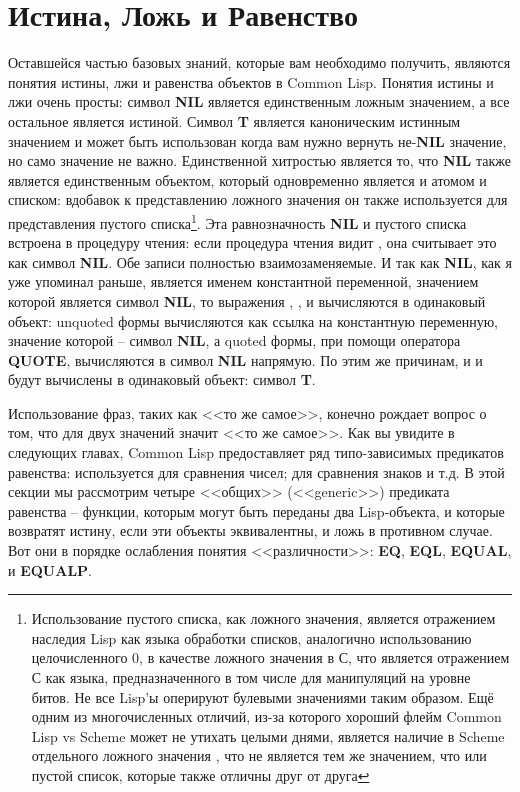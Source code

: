 \section{Истина, Ложь и Равенство}

Оставшейся частью базовых знаний, которые вам необходимо получить, являются понятия
истины, лжи и равенства объектов в Common Lisp. Понятия истины и лжи очень просты: символ
\textbf{NIL} является единственным ложным значением, а все остальное является
истиной. Символ \textbf{T} является каноническим истинным значением и может быть
использован когда вам нужно вернуть не-\textbf{NIL} значение, но само значение не
важно. Единственной хитростью является то, что \textbf{NIL} также является единственным
объектом, который одновременно является и атомом и списком: вдобавок к представлению
ложного значения он также используется для представления пустого
списка\footnote{Использование пустого списка, как ложного значения, является отражением
  наследия Lisp как языка обработки списков, аналогично использованию целочисленного 0, в
  качестве ложного значения в С, что является отражением С как языка, предназначенного в
  том числе для манипуляций на уровне битов. Не все Lisp'ы оперируют булевыми значениями
  таким образом. Ещё одним из многочисленных отличий, из-за которого хороший флейм Common
  Lisp vs Scheme может не утихать целыми днями, является наличие в Scheme отдельного
  ложного значения , что не является тем же значением, что  или пустой
  список, которые также отличны друг от друга}. Эта равнозначность \textbf{NIL} и пустого
списка встроена в процедуру чтения: если процедура чтения видит \code{()}, она считывает
это как символ \textbf{NIL}. Обе записи полностью взаимозаменяемые. И так как
\textbf{NIL}, как я уже упоминал раньше, является именем константной переменной, значением
которой является символ \textbf{NIL}, то выражения , \code{()},  и
 вычисляются в одинаковый объект: unquoted формы вычисляются как ссылка на
константную переменную, значение которой -- символ \textbf{NIL}, а quoted формы, при
помощи оператора \textbf{QUOTE}, вычисляются в символ \textbf{NIL} напрямую. По этим же
причинам, и  и  будут вычислены в одинаковый объект: символ \textbf{T}.

Использование фраз, таких как <<то же самое>>, конечно рождает вопрос о том, что для двух
значений значит <<то же самое>>. Как вы увидите в следующих главах, Common Lisp
предоставляет ряд типо-зависимых предикатов равенства: \code{=} используется для сравнения
чисел;  для сравнения знаков и т.д. В этой секции мы рассмотрим четыре <<общих>>
(<<generic>>) предиката равенства -- функции, которым могут быть переданы два Lisp-объекта,
и которые возвратят истину, если эти объекты эквивалентны, и ложь в противном случае. Вот
они в порядке ослабления понятия <<различности>>: \textbf{EQ}, \textbf{EQL}, \textbf{EQUAL},
и \textbf{EQUALP}.

